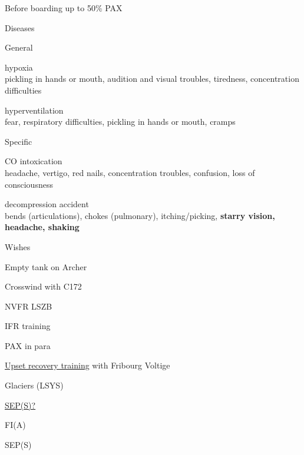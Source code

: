 \documentclass{checklists}
\begin{document}
\begin{CheckListRule}{Before boarding}{}%
	\vspace{2mm}
			{up to 50\% PAX}
\end{CheckListRule}%
\vfill
\begin{SubWrapper}{Diseases}{}%
\begin{SubCheckList}{General}{}%
	\item hypoxia\\\phantom{boooo}
		pickling in hands or mouth, audition and visual troubles, tiredness, concentration difficulties
	\item hyperventilation\\\phantom{boooo}
		fear, respiratory difficulties, pickling in hands or mouth, cramps
\end{SubCheckList}%
\begin{SubCheckList}{Specific}%
	\item CO intoxication\\\phantom{boooo}
		headache, vertigo, red nails, concentration troubles, confusion, loss of consciousness
	\item decompression accident\\\phantom{boooo}
		bends (articulations), chokes (pulmonary), itching/picking, \textbf{starry vision, headache, shaking}
\end{SubCheckList}%
\end{SubWrapper}%
\SkipPage
\begin{CheckListRule}{Wishes}{}%
\renewcommand{\labelenumi}{\Square}
	\item Empty tank on Archer
	\item Crosswind with C172
	\item NVFR LSZB
	\item IFR training
	\item PAX in para
	\item \href{http://www.fribourg-voltige.ch/Activlites.htm}{Upset recovery
		training} with Fribourg Voltige
	\item Glaciers (LSYS)
	\item \href{http://fr.seaplanes.ch/}{SEP(S)?}
	\item FI(A)
	\item SEP(S)
\end{CheckListRule}
\end{document}
